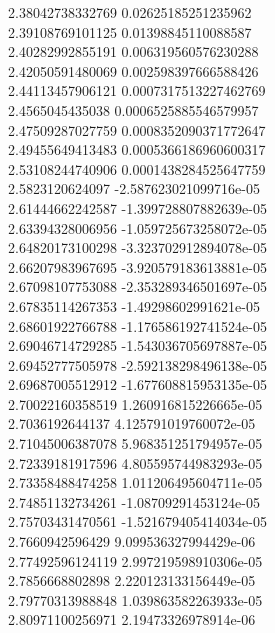 {2.38042738332769 0.02625185251235962 \\
2.39108769101125 0.01398845110088587 \\
2.40282992855191 0.006319560576230288 \\
2.42050591480069 0.002598397666588426 \\
2.44113457906121 0.0007317513227462769 \\
2.4565045435038 0.0006525885546579957 \\
2.47509287027759 0.0008352090371772647 \\
2.49455649413483 0.0005366186960600317 \\
2.53108244740906 0.0001438284525647759 \\
2.5823120624097 -2.587623021099716e-05 \\
2.61444662242587 -1.399728807882639e-05 \\
2.63394328006956 -1.059725673258072e-05 \\
2.64820173100298 -3.323702912894078e-05 \\
2.66207983967695 -3.920579183613881e-05 \\
2.67098107753088 -2.353289346501697e-05 \\
2.67835114267353 -1.49298602991621e-05 \\
2.68601922766788 -1.176586192741524e-05 \\
2.69046714729285 -1.543036705697887e-05 \\
2.69452777505978 -2.592138298496138e-05 \\
2.69687005512912 -1.677608815953135e-05 \\
2.70022160358519 1.260916815226665e-05 \\
2.7036192644137 4.125791019760072e-05 \\
2.71045006387078 5.968351251794957e-05 \\
2.72339181917596 4.805595744983293e-05 \\
2.73358488474258 1.011206495604711e-05 \\
2.74851132734261 -1.08709291453124e-05 \\
2.75703431470561 -1.521679405414034e-05 \\
2.7660942596429 9.099536327994429e-06 \\
2.77492596124119 2.997219598910306e-05 \\
2.7856668802898 2.220123133156449e-05 \\
2.79770313988848 1.039863582263933e-05 \\
2.80971100256971 2.19473326978914e-06 \\
}
